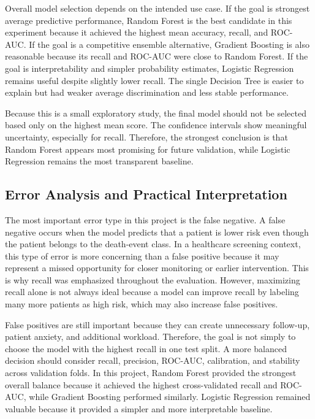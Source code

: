\documentclass{article}
\begin{document}
Overall model selection depends on the intended use case. If the goal is strongest average predictive performance, Random Forest is the best candidate in this experiment because it achieved the highest mean accuracy, recall, and ROC-AUC. If the goal is a competitive ensemble alternative, Gradient Boosting is also reasonable because its recall and ROC-AUC were close to Random Forest. If the goal is interpretability and simpler probability estimates, Logistic Regression remains useful despite slightly lower recall. The single Decision Tree is easier to explain but had weaker average discrimination and less stable performance.

Because this is a small exploratory study, the final model should not be selected based only on the highest mean score. The confidence intervals show meaningful uncertainty, especially for recall. Therefore, the strongest conclusion is that Random Forest appears most promising for future validation, while Logistic Regression remains the most transparent baseline.

\subsection{Error Analysis and Practical Interpretation}

The most important error type in this project is the false negative. A false negative occurs when the model predicts that a patient is lower risk even though the patient belongs to the death-event class. In a healthcare screening context, this type of error is more concerning than a false positive because it may represent a missed opportunity for closer monitoring or earlier intervention. This is why recall was emphasized throughout the evaluation. However, maximizing recall alone is not always ideal because a model can improve recall by labeling many more patients as high risk, which may also increase false positives.

False positives are still important because they can create unnecessary follow-up, patient anxiety, and additional workload. Therefore, the goal is not simply to choose the model with the highest recall in one test split. A more balanced decision should consider recall, precision, ROC-AUC, calibration, and stability across validation folds. In this project, Random Forest provided the strongest overall balance because it achieved the highest cross-validated recall and ROC-AUC, while Gradient Boosting performed similarly. Logistic Regression remained valuable because it provided a simpler and more interpretable baseline.
\end{document}
